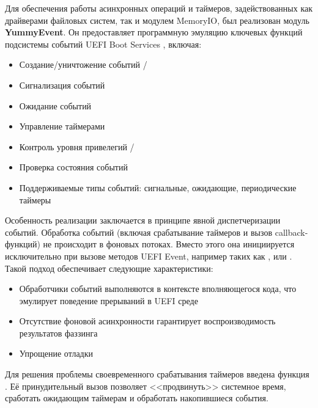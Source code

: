 Для обеспечения работы асинхронных операций и таймеров, задействованных как драйверами файловых систем, так и модулем MemoryIO, был реализован модуль \textbf{YummyEvent}. Он предоставляет программную эмуляцию ключевых функций подсистемы событий UEFI Boot Services \cite{UEFISpec}, включая:
\begin{itemize}
	 \item Создание/уничтожение событий /
	 \item Сигнализация событий 
	 \item Ожидание событий 
	 \item Управление таймерами 
	 \item Контроль уровня привелегий /
	 \item Проверка состояния событий 
	 \item Поддерживаемые типы событий: сигнальные, ожидающие, периодические таймеры
\end{itemize}

Особенность реализации заключается в принципе явной диспетчеризации событий. Обработка событий (включая срабатывание таймеров и вызов callback-функций) не происходит в фоновых потоках. Вместо этого она инициируется исключительно при вызове методов UEFI Event, например таких как ,  или . Такой подход обеспечивает следующие характеристики:
\begin{itemize}
	\item Обработчики событий выполняются в контексте вполняющегося кода, что эмулирует поведение прерываний в UEFI среде
	\item Отсутствие фоновой асинхронности гарантирует воспроизводимость результатов фаззинга
	\item Упрощение отладки
\end{itemize}

Для решения проблемы своевременного срабатывания таймеров введена функция . Её принудительный вызов позволяет <<продвинуть>> системное время, сработать ожидающим таймерам и обработать накопившиеся события. 
